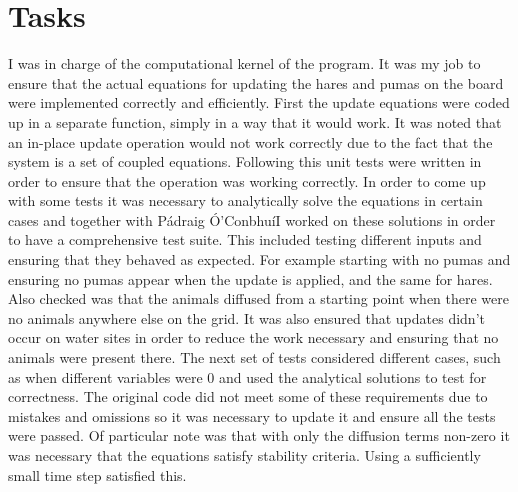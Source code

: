\documentclass[12pt]{article}    %
\numberwithin{equation}{section}
\newcommand{\pa}{P\'{a}draig \'{O}'Conbhu\'{i}}
\begin{document}
\section{Tasks}
I was in charge of the computational kernel of the program.
It was my job to ensure that the actual equations for updating the hares and pumas on the board were implemented correctly and efficiently.
First the update equations were coded up in a separate function, simply in a way that it would work.
It was noted that an in-place update operation would not work correctly due to the fact that the system is a set of coupled equations.
Following this unit tests were written in order to ensure that the operation was working correctly.
In order to come up with some tests it was necessary to analytically solve the equations in certain cases and together with \pa I worked on these solutions in order to have a comprehensive test suite.
This included testing different inputs and ensuring that they behaved as expected.
For example starting with no pumas and ensuring no pumas appear when the update is applied, and the same for hares.
Also checked was that the animals diffused from a starting point when there were no animals anywhere else on the grid.
It was also ensured that updates didn't occur on water sites in order to reduce the work necessary and ensuring that no animals were present there.
The next set of tests considered different cases, such as when different variables were 0 and used the analytical solutions to test for correctness.
The original code did not meet some of these requirements due to mistakes and omissions so it was necessary to update it and ensure all the tests were passed.
Of particular note was that with only the diffusion terms non-zero it was necessary that the equations satisfy stability criteria.
Using a sufficiently small time step satisfied this.
\end{document}
